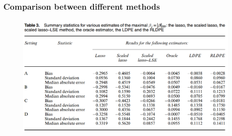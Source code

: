 \begin{frame}
\frametitle{Comparison between different methods}
\begin{figure}[h]
  \centering
  \includegraphics[width=1.0\textwidth]{figs/Table3.png}
  \label{Table1}
\end{figure}
\end{frame}



